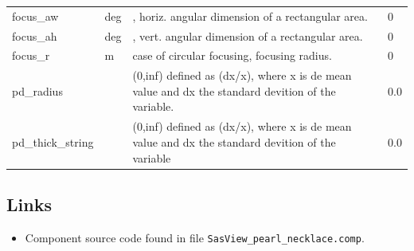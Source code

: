 \begin{longtable}{p{}p{}p{}p{}}
focus\_aw & deg & , horiz. angular dimension of a rectangular area. & 0 \\
focus\_ah & deg & , vert. angular dimension of a rectangular area. & 0 \\
focus\_r & m & case of circular focusing, focusing radius. & 0 \\
pd\_radius &  & (0,inf) defined as (dx/x), where x is de mean value and dx the standard devition of the variable. & 0.0 \\
pd\_thick\_string &  & (0,inf) defined as (dx/x), where x is de mean value and dx the standard devition of the variable & 0.0 \\
\bottomrule
\end{longtable}

\subsection*{Links}
\begin{itemize}
  \item Component source code found in file \texttt{SasView\_pearl\_necklace.comp}.
\end{itemize}
